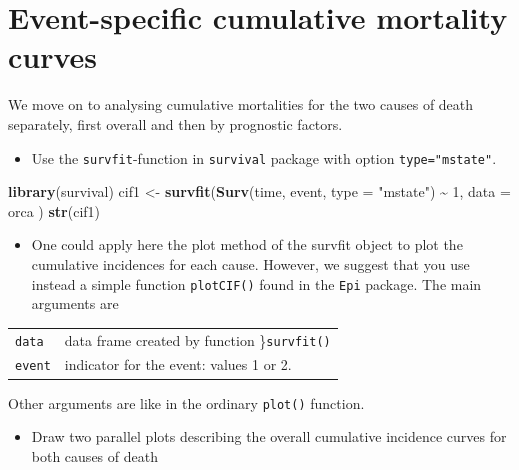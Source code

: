 \documentclass[
]{book}
\newenvironment{Shaded}{\begin{snugshade}}{\end{snugshade}}
\newcommand{\AttributeTok}[1]{\textcolor[rgb]{0.13,0.29,0.53}{#1}}
\newcommand{\DecValTok}[1]{\textcolor[rgb]{0.00,0.00,0.81}{#1}}
\newcommand{\FunctionTok}[1]{\textcolor[rgb]{0.13,0.29,0.53}{\textbf{#1}}}
\newcommand{\NormalTok}[1]{#1}
\newcommand{\OtherTok}[1]{\textcolor[rgb]{0.56,0.35,0.01}{#1}}
\newcommand{\SpecialCharTok}[1]{\textcolor[rgb]{0.81,0.36,0.00}{\textbf{#1}}}
\newcommand{\StringTok}[1]{\textcolor[rgb]{0.31,0.60,0.02}{#1}}
\providecommand{\tightlist}{%
  \setlength{\itemsep}{0pt}\setlength{\parskip}{0pt}}
\begin{document}
\section{Event-specific cumulative mortality curves}\label{event-specific-cumulative-mortality-curves}

We move on to analysing cumulative mortalities for the
two causes of death separately, first overall and then
by prognostic factors.

\begin{itemize}
\tightlist
\item
  Use the \texttt{survfit}-function in \texttt{survival} package with option \texttt{type="mstate"}.
\end{itemize}

\begin{Shaded}
\begin{Highlighting}[]
\FunctionTok{library}\NormalTok{(survival)}
\NormalTok{cif1 }\OtherTok{\textless{}{-}} \FunctionTok{survfit}\NormalTok{(}\FunctionTok{Surv}\NormalTok{(time, event, }\AttributeTok{type =} \StringTok{"mstate"}\NormalTok{) }\SpecialCharTok{\textasciitilde{}} \DecValTok{1}\NormalTok{,}
  \AttributeTok{data =}\NormalTok{ orca}
\NormalTok{)}
\FunctionTok{str}\NormalTok{(cif1)}
\end{Highlighting}
\end{Shaded}

\begin{itemize}
\tightlist
\item
  One could apply here the plot method of the survfit object to plot the
  cumulative incidences for each cause. However, we suggest that you use
  instead a simple function \texttt{plotCIF()} found in the \texttt{Epi} package.
  The main arguments are
\end{itemize}

\begin{longtable}[]{@{}ll@{}}
\toprule\noalign{}
\endhead
\bottomrule\noalign{}
\endlastfoot
\texttt{data} & data frame created by function \}\texttt{survfit()} \\
\texttt{event} & indicator for the event: values 1 or 2. \\
\end{longtable}

Other arguments are like in the ordinary \texttt{plot()} function.

\begin{itemize}
\tightlist
\item
  Draw two parallel plots describing
  the overall cumulative incidence curves for both causes of death
\end{itemize}
\end{document}
